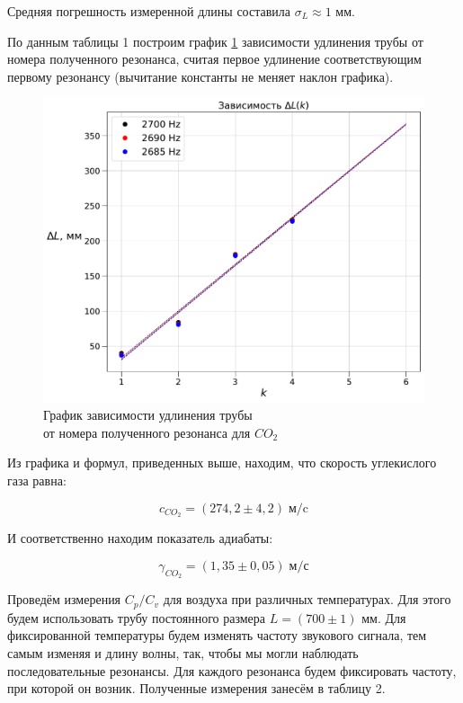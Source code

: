 \documentclass[a4paper, 12pt]{article}
\begin{document}
\bigskip

Средняя погрешность измеренной длины составила $\sigma_L\approx 1$ мм.

По данным таблицы 1 построим график \ref{fig:CO} зависимости удлинения трубы от номера полученного резонанса, считая первое удлинение соответствующим первому резонансу (вычитание константы не меняет наклон графика).

\begin{figure}[H]
	\begin{center}
		\includegraphics[scale=0.60]{CO.pdf}
		\caption{\centering График зависимости удлинения трубы \\ от номера полученного резонанса для $CO_2$}
		\label{fig:CO}
	\end{center}
\end{figure}

Из графика и формул, приведенных выше, находим, что скорость углекислого газа равна:

\begin{equation}
    c_{CO_2} = (274,2 \pm 4,2) \; \text{м/c}
\end{equation}

И соответственно находим показатель адиабаты:

\begin{equation}
    \gamma_{CO_2} = (1,35 \pm 0,05) \; \text{м/с} 
\end{equation}

Проведём измерения $ C_p/C_v $ для воздуха при различных температурах. Для этого будем использовать трубу постоянного размера $L = (700 \pm 1)$ мм. Для фиксированной температуры будем изменять частоту звукового сигнала, тем самым изменяя и длину волны, так, чтобы мы могли наблюдать последовательные резонансы. Для каждого резонанса будем фиксировать частоту, при которой он возник. Полученные измерения занесём в таблицу 2.
\end{document}
